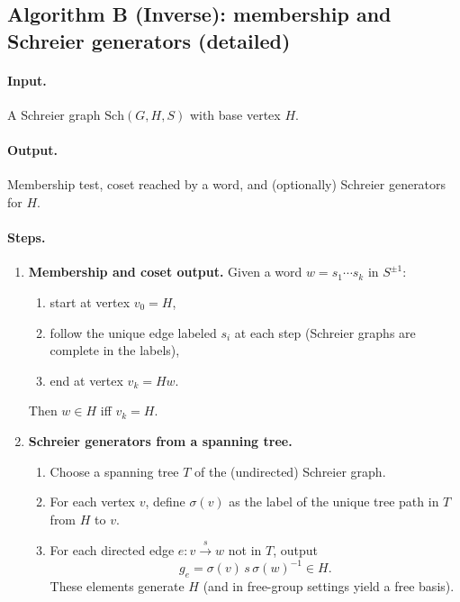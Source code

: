 \documentclass[11pt]{article}
\theoremstyle{definition}
\theoremstyle{plain}
\theoremstyle{remark}
\newcommand{\Sch}{\mathrm{Sch}}
\begin{document}
\subsection*{Algorithm B (Inverse): membership and Schreier generators (detailed)}\cite{schreier1927,toddcoxeter1936,serre1980trees,holt2005}
\paragraph{Input.} A Schreier graph $\Sch(G,H,S)$ with base vertex $H$.
\paragraph{Output.} Membership test, coset reached by a word, and (optionally) Schreier generators for $H$.

\paragraph{Steps.}
\begin{enumerate}[leftmargin=2.2em]
\item \textbf{Membership and coset output.}
Given a word $w=s_1\cdots s_k$ in $S^{\pm1}$:
\begin{enumerate}[leftmargin=2em]
\item start at vertex $v_0=H$,
\item follow the unique edge labeled $s_i$ at each step (Schreier graphs are complete in the labels),
\item end at vertex $v_k=Hw$.
\end{enumerate}
Then $w\in H$ iff $v_k=H$.

\item \textbf{Schreier generators from a spanning tree.}
\begin{enumerate}[leftmargin=2em]
\item Choose a spanning tree $T$ of the (undirected) Schreier graph.
\item For each vertex $v$, define $\sigma(v)$ as the label of the unique tree path in $T$ from $H$ to $v$.
\item For each directed edge $e:v\xrightarrow{s}w$ not in $T$, output
\[
g_e=\sigma(v)\,s\,\sigma(w)^{-1}\in H.
\]
These elements generate $H$ (and in free-group settings yield a free basis).
\end{enumerate}
\end{enumerate}
\end{document}
